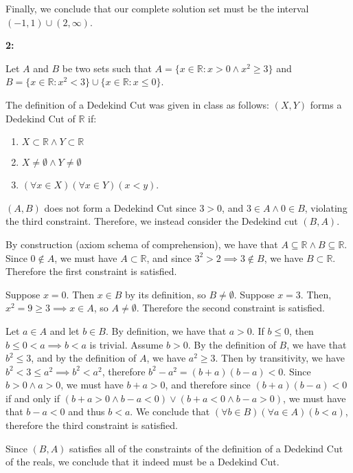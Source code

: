 \documentclass{article}
\newcommand{\reals}{\mathbb{R}}
\begin{document}
Finally, we conclude that our complete solution set
must be the interval $(-1,1) \cup (2, \infty)$.

\medskip
\textbf{2:}

Let $A$ and $B$ be two sets such that
$A = \{x \in \reals: x > 0 \land x^2 \geq 3\}$
and $B = \{x \in \reals: x^2 < 3\} \cup \{x \in \reals: x \le 0\}$.

The definition of a Dedekind Cut was given in class as follows:
$(X,Y)$ forms a Dedekind Cut of $\reals$ if:
\begin{enumerate}
	\item
	$X \subset \reals \land Y \subset \reals$
	\item
	$X \neq \emptyset \land Y \neq \emptyset$
	\item
	$(\forall x \in X)(\forall x \in Y)(x < y)$.
\end{enumerate}

\medskip
$(A,B)$ does not form a Dedekind Cut since $3 > 0$, and $3 \in A \land 0 \in B$,
violating the third constraint. Therefore, we instead consider the Dedekind cut $(B,A)$.

By construction (axiom schema of comprehension), we have that $A \subseteq \reals \land B \subseteq \reals$.
Since $0 \not\in A$, we must have $A \subset \reals$,
and since $3^2 > 2 \implies 3 \not\in B$, we have $B \subset \reals$.
Therefore the first constraint is satisfied.

Suppose $x = 0$. Then $x \in B$ by its definition, so $B \neq \emptyset$.
Suppose $x = 3$. Then, $x^2 = 9  \geq 3 \implies x \in A$, so $A \neq \emptyset$.
Therefore the second constraint is satisfied.

Let $a \in A$ and let $b \in B$.
By definition, we have that $a > 0$.
If $b \leq 0$, then $b \leq 0 < a \implies b < a$ is trivial.
Assume $b > 0$. By the definition of $B$, we have that $b^2 \leq 3$,
and by the definition of $A$, we have $a^2 \geq 3$.
Then by transitivity, we have $b^2 < 3 \le a^2 \implies b^2 < a^2$,
therefore $b^2 - a^2 = (b+a)(b-a) < 0$.
Since $b > 0 \land a > 0$, we must have $b + a > 0$,
and therefore since $(b+a)(b-a) < 0$ if and only if
$(b+a > 0 \land b-a < 0) \lor (b + a < 0 \land b - a > 0)$,
we must have that $b-a < 0$ and thus $b < a$.
We conclude that $(\forall b \in B)(\forall a \in A)(b < a)$,
therefore the third constraint is satisfied.

Since $(B,A)$ satisfies all of the constraints of the definition
of a Dedekind Cut of the reals, we conclude that it indeed must be a Dedekind Cut.
\end{document}
